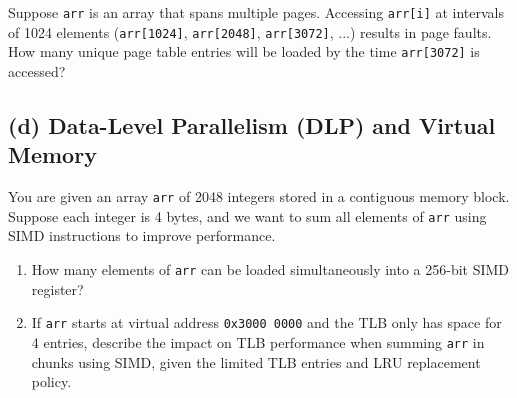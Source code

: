 \documentclass{article}
\begin{document}
Suppose \texttt{arr} is an array that spans multiple pages. Accessing \texttt{arr[i]} at intervals of 1024 elements (\texttt{arr[1024]}, \texttt{arr[2048]}, \texttt{arr[3072]}, ...) results in page faults. How many unique page table entries will be loaded by the time \texttt{arr[3072]} is accessed?

\vspace{1cm}

\subsection*{(d) Data-Level Parallelism (DLP) and Virtual Memory}

You are given an array \texttt{arr} of 2048 integers stored in a contiguous memory block. Suppose each integer is 4 bytes, and we want to sum all elements of \texttt{arr} using SIMD instructions to improve performance.

\begin{enumerate}[label=\arabic*.]
    \item How many elements of \texttt{arr} can be loaded simultaneously into a 256-bit SIMD register? \\[0.9cm]

    \item If \texttt{arr} starts at virtual address \texttt{0x3000 0000} and the TLB only has space for 4 entries, describe the impact on TLB performance when summing \texttt{arr} in chunks using SIMD, given the limited TLB entries and LRU replacement policy. \\[0.2cm]
\end{enumerate}
\end{document}
